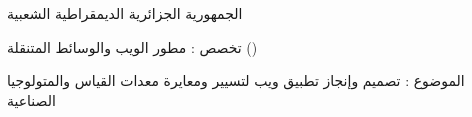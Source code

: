 \documentclass{article}
\begin{document}
\setRTL
الجمهورية الجزائرية الديمقراطية الشعبية

تخصص : مطور الويب والوسائط المتنقلة ()

الموضوع : تصميم وإنجاز تطبيق ويب لتسيير ومعايرة معدات القياس والمتولوجيا الصناعية
\end{document}
